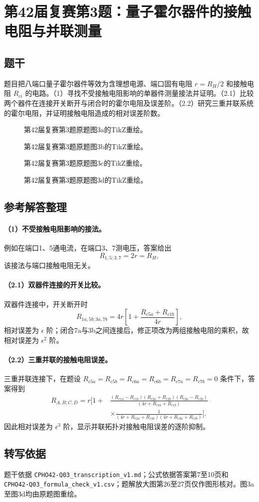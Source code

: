 \section{第42届复赛第3题：量子霍尔器件的接触电阻与并联测量}
\subsection{题干}
题目把八端口量子霍尔器件等效为含理想电源、端口固有电阻 $r=R_H/2$ 和接触电阻 $R_{ci}$ 的电路。（1）寻找不受接触电阻影响的单器件测量接法并证明。（2.1）比较两个器件在连接开关断开与闭合时的霍尔电阻及误差阶。（2.2）研究三重并联系统的霍尔电阻，并证明接触电阻造成的相对误差阶数。
\begin{figure}[htbp]\centering\caption{第42届复赛第3题原题图3a的TikZ重绘。}\end{figure}
\begin{figure}[htbp]\centering\caption{第42届复赛第3题原题图3b的TikZ重绘。}\end{figure}
\begin{figure}[htbp]\centering\caption{第42届复赛第3题原题图3c的TikZ重绘。}\end{figure}
\begin{figure}[htbp]\centering\caption{第42届复赛第3题原题图3d的TikZ重绘。}\end{figure}
\subsection{参考解答整理}
\paragraph{（1）不受接触电阻影响的接法。}
例如在端口1、5通电流，在端口3、7测电压，答案给出
\[R_{1,5;3,7}=2r=R_H,\]
该接法与端口接触电阻无关。
\paragraph{（2.1）双器件连接的开关比较。}
双器件连接中，开关断开时
\[R_{1a,5b;3a,7b}=4r\left[1+\frac{R_{c5a}+R_{c1b}}{4r}\right],\]
相对误差为 $\epsilon$ 阶；闭合7a与3b之间连接后，修正项改为两组接触电阻的乘积，故相对误差为 $\epsilon^2$ 阶。

\paragraph{（2.2）三重并联的接触电阻误差。}
三重并联连接下，在题设 $R_{c5a}=R_{c5b}=R_{c6a}=R_{c6b}=R_{c7a}=R_{c7b}=0$ 条件下，答案得到
\[\begin{aligned}R_{A,B;C,D}=r\biggl[1+&\frac{(R_{c1a}-R_{c1b})(R_{c2a}+R_{c2b})(R_{c3a}-R_{c3b})}{(4r+R_{c1a}+R_{c1b})}\\&\times\frac1{(4r+R_{c2a}+R_{c2b})(4r+R_{c3a}+R_{c3b})}\biggr].\end{aligned}\]
因此相对误差为 $\epsilon^3$ 阶，显示并联拓扑对接触电阻误差的逐阶抑制。
\subsection{转写依据}
题干依据 \texttt{CPHO42-Q03\_transcription\_v1.md}；公式依据答案第7至10页和 \texttt{CPHO42-Q03\_formula\_check\_v1.csv}；题解放大图第26至27页仅作图形核对。图3a至图3d均由原题图重绘。
